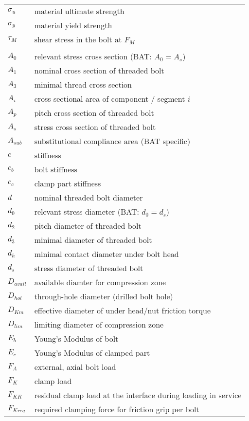 \begin{longtable}{p{2cm} l}
  $\sigma_u$ & material ultimate strength \\
  $\sigma_y$ & material yield strength \\
  $\tau_M$ & shear stress in the bolt at $F_M$\\
  & \\
  $A_0$ & relevant stress cross section (BAT: $A_0 = A_s$) \\
  $A_1$ & nominal cross section of threaded bolt \\
  $A_3$ & minimal thread cross section \\
  $A_i$ & cross sectional area of component / segment $i$ \\
  $A_p$ & pitch cross section of threaded bolt \\
  $A_s$ & stress cross section of threaded bolt \\
  $A_{sub}$ & substitutional compliance area (BAT specific) \\
  $c$ & stiffness \\
  $c_b$ & bolt stiffness \\
  $c_c$ & clamp part stiffness \\
  $d$ & nominal threaded bolt diameter \\
  $d_0$ & relevant stress diameter (BAT: $d_0=d_s$) \\
  $d_2$ & pitch diameter of threaded bolt \\
  $d_3$ & minimal diameter of threaded bolt \\
  $d_h$ & minimal contact diameter under bolt head \\
  $d_s$ & stress diameter of threaded bolt \\
  $D_{avail}$ & available diamter for compression zone \\
  $D_{hol}$ & through-hole diameter (drilled bolt hole) \\
  $D_{Km}$ & effective diameter of under head/nut friction torque \\
  $D_{lim}$ & limiting diameter of compression zone \\
  $E_b$ & Young's Modulus of bolt \\
  $E_c$ & Young's Modulus of clamped part \\
  $F_A$ & external, axial bolt load \\
  $F_K$ & clamp load \\
  $F_{KR}$ & residual clamp load at the interface during loading in service \\
  $F_{Kreq}$ & required clamping force for friction grip per bolt \\

\end{longtable}
